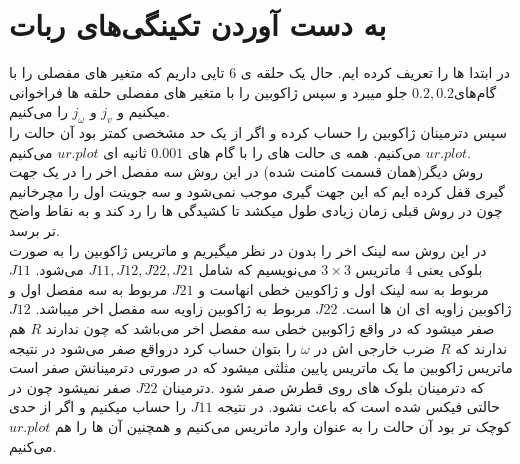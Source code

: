 \documentclass{article}
\begin{document}
\section{به دست آوردن تکینگی‌های ربات}
در ابتدا  ها را تعریف کرده ایم. حال یک حلقه ی 6 تایی داریم که متغیر های مفصلی را با گام‌های$0.2, 0.2$ جلو میبرد و سپس ژاکوبین   را با متغیر های مفصلی حلقه ها فراخوانی میکنیم و $j_{v}$ و $j_{\omega}$ را  می‌کنیم.
\\
سپس دترمینان ژاکوبین را حساب کرده و اگر از یک حد مشخصی کمتر بود آن حالت را $ur.plot$ می‌کنیم. همه ی حالت های   را با گام های $ 0.001$ ثانیه ای $ur.plot$ می‌کنیم.
\\
روش دیگر(همان قسمت کامنت شده) در این روش سه مفصل اخر را در یک  جهت گیری قفل کرده ایم که این جهت گیری موجب   نمی‌شود و سه جوینت اول را مچرخانیم چون در روش قبلی زمان زیادی طول میکشد تا کشیدگی ها را رد کند و به نقاط واضح تر   برسد.
\\
در این روش سه لینک اخر را بدون  در نظر میگیریم و ماتریس ژاکوبین را به صورت بلوکی یعنی 4 ماتریس $3\times3$ می‌نویسیم که شامل $ J11,J12,J22,J21 $ می‌شود. $J11$ مربوط به سه لینک اول و ژاکوبین خطی انهاست و $J21$ مربوط به سه مفصل اول و ژاکوبین زاویه ای ان ها است. $J22$ مربوط به ژاکوبین زاویه سه مفصل اخر میباشد. $J12$ صفر میشود که در واقع ژاکوبین خطی سه مفصل اخر می‌باشد که چون  ندارند $R$ هم ندارند که $R$ ضرب خارجی اش در $\omega$ را بتوان حساب کرد درواقع صفر می‌شود در نتیجه ماتریس ژاکوبین ما یک ماتریس پایین مثلثی میشود که در صورتی دترمینانش صفر است که دترمینان بلوک های روی قطرش صفر شود .دترمینان $J22$ صفر نمیشود چون در حالتی فیکس شده است که باعث   نشود. در نتیجه $J11$ را حساب میکنیم و اگر از حدی کوچک تر بود آن حالت را به عنوان   وارد ماتریس  می‌کنیم و همچنین آن ها را هم $ur.plot$ می‌کنیم.
\end{document}
